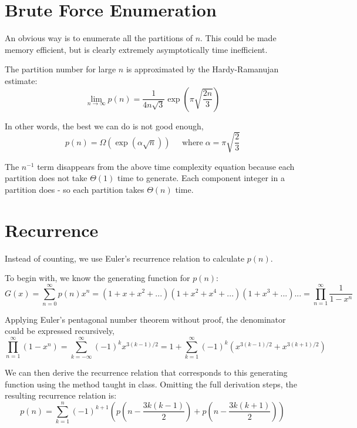\documentclass{article}
\begin{document}

\section{Brute Force Enumeration} %

An obvious way is to enumerate all the partitions of \(n\). This could be made memory efficient, but is clearly extremely asymptotically time inefficient.

The partition number for large \(n\) is approximated by the Hardy-Ramanujan estimate:\\
\[\lim_{n \to \infty} p(n) = \frac{1}{4n\sqrt{3}} \exp(\pi \sqrt{\frac{2n}{3}})\]

In other words, the best we can do is not good enough,
\[p(n) = \Omega (\exp(\alpha  \sqrt{n}))  \;\;\;\;\; \mathrm{where} \;  \alpha = \pi \sqrt{\frac{2}{3}}\]

The \(n^{-1}\) term disappears from the above time complexity equation because each partition does not take \(\Theta(1)\) time to generate. Each component integer in a partition does - so each partition takes \(\Theta(n)\) time.



\section{Recurrence}

Instead of counting, we use Euler's recurrence relation to calculate \(p(n)\).

To begin with, we know the generating function for \(p(n)\):
\[G(x) =\sum_{n=0}^{\infty}p(n) x^{n}= (1+x+x^2+...)(1+x^2+x^4+...)(1+x^3+...)... = \prod_{n=1}^{\infty}\frac{1}{1-x^n}\]

Applying Euler's pentagonal number theorem without proof, the denominator could be expressed recursively,
\[\prod_{n=1}^{\infty}(1-x^n) = \sum_{k=-\infty}^{\infty} (-1)^k x^{3(k-1)/2} = 1+ \sum_{k=1}^{\infty} (-1)^k (x^{3(k-1)/2} + x^{3(k+1)/2})\]

We can then derive the recurrence relation that corresponds to this generating function using the method taught in class. Omitting the full derivation steps, the resulting recurrence relation is:
\[p(n) = \sum_{k=1}^{n} (-1)^{k+1}(p(n-\frac{3k(k-1)}{2}) + p(n-\frac{3k(k+1)}{2}))\]
\end{document}
